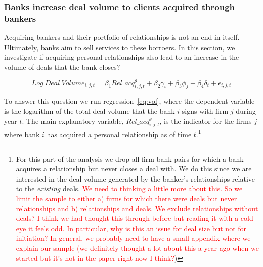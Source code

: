 \subsubsection{Banks increase deal volume to clients acquired through bankers}

Acquiring bankers and their portfolio of relationships is not an end in itself. Ultimately, banks aim to sell services to these borroers. In this section, we investigate if acquiring personal relationships also lead to an increase in the volume of deals that the bank closes? 

\begin{equation} \label{eq:vol}
Log\ Deal\ Volume_{i,j,t} = \beta_1 Rel\_acq^\theta_{i,j,t} + \beta_2 \gamma_i + \beta_3 \phi_j + \beta_4 \delta_{t} + \epsilon_{i,j,t}
\end{equation}

To answer this question we run regression~\ref{eq:vol}, where the dependent variable is the logarithm of the total deal volume that the bank $i$ signs with firm $j$ during year $t$. The main explanatory variable, $Rel\_acq^\theta_{i,j,t}$, is the indicator for the firms $j$ where bank $i$ has acquired a personal relationship as of time $t$.\footnote{For this part of the analysis we drop all firm-bank pairs for which a bank acquires a relationship but never closes a deal with. We do this since we are interested in the deal volume generated by the banker's relationships relative to the \emph{existing} deals. \textcolor{red}{We need to thinking a little more about this. So we limit the sample to either a) firms for which there were deals but never relationships and b) relationships and deals. We exclude relationships without deals? I think we had thought this through before but reading it with a cold eye it feels odd. In particular, why is this an issue for deal size but not for initiation? In general, we probably need to have a small appendix where we explain our sample (we definitely thought a lot about this a year ago when we started but it's not in the paper right now I think?})} %

